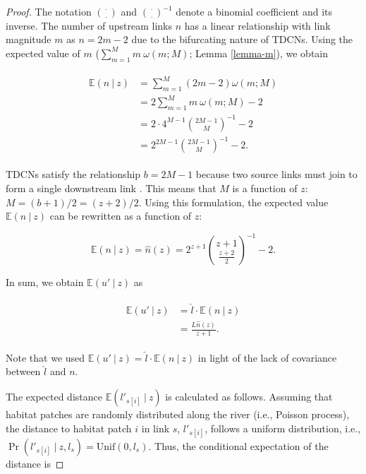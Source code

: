 \documentclass[11pt, class=article, crop=false]{standalone}
\theoremstyle{definition}
\begin{document}
\begin{proof}
The notation $\binom{\cdot}{\cdot}$ and $\binom{\cdot}{\cdot}^{-1}$ denote a binomial coefficient and its inverse.
The number of upstream links $n$ has a linear relationship with link magnitude $m$ as $n = 2m - 2$ due to the bifurcating nature of TDCNs.
Using the expected value of $m$ ($\sum_{m=1}^{M} m~\omega(m; M)$; Lemma \ref{lemma-m}), we obtain

\begin{align}
    \begin{split}
    \mathbb{E}(n~|~z) 
        &= \sum_{m=1}^{M} (2m - 2) \omega(m; M)\\
        &= 2 \sum_{m=1}^{M} m~\omega(m; M) - 2\\
        &= 2 \cdot 4^{M-1} \binom{2M-1}{M}^{-1} - 2\\
        &= 2^{2M-1} \binom{2M-1}{M}^{-1} - 2.
    \end{split}
    \label{eq:n-hat}
\end{align}

TDCNs satisfy the relationship $b = 2M - 1$ because two source links must join to form a single downstream link \citep{shreve_infinite_1967, rodriguez-iturbe_fractal_2001}.
This means that $M$ is a function of $z$: $M = (b + 1) / 2 = (z + 2) / 2$.
Using this formulation, the expected value $\mathbb{E}(n~|~z)$ can be rewritten as a function of $z$:

\begin{equation}
    \mathbb{E}(n~|~z) = \hat{n}(z) = 
    2^{z + 1} \binom{z + 1}{\frac{z + 2}{2}}^{-1} - 2.
\end{equation}

In sum, we obtain $\mathbb{E}(u' ~|~ z)$ as

\begin{align}
    \begin{split}
        \mathbb{E}(u' ~|~ z) 
        &= \hat{l} \cdot \mathbb{E}(n ~|~ z)\\
        &= \frac{L \hat{n}(z)}{z + 1}.
    \end{split}
\end{align}

Note that we used $\mathbb{E}(u' ~|~ z)  = \hat{l} \cdot \mathbb{E}(n ~|~ z)$ in light of the lack of covariance between $\hat{l}$ and $n$.

The expected distance $\mathbb{E}(l'_{s[i]}~|~z)$ is calculated as follows.
Assuming that habitat patches are randomly distributed along the river (i.e., Poisson process), the distance to habitat patch $i$ in link $s$, $l'_{s[i]}$, follows a uniform distribution, i.e.,  $\Pr(l'_{s[i]}~|~z, l_s) = \mbox{Unif}(0, l_s)$.
Thus, the conditional expectation of the distance is


\end{proof}
\end{document}
